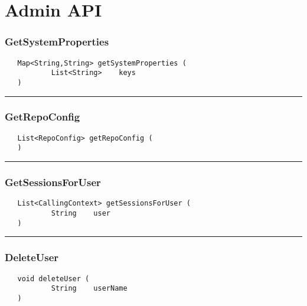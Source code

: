 \chapter{Admin API}

\subsection{GetSystemProperties}
\label{Api:GetSystemProperties}
\begin{verbatim}
   Map<String,String> getSystemProperties (
           List<String>    keys
   )
\end{verbatim}



\rule{15cm}{2pt}
\subsection{GetRepoConfig}
\label{Api:GetRepoConfig}
\begin{verbatim}
   List<RepoConfig> getRepoConfig (
   )
\end{verbatim}



\rule{15cm}{2pt}
\subsection{GetSessionsForUser}
\label{Api:GetSessionsForUser}
\begin{verbatim}
   List<CallingContext> getSessionsForUser (
           String    user
   )
\end{verbatim}



\rule{15cm}{2pt}
\subsection{DeleteUser}
\label{Api:DeleteUser}
\begin{verbatim}
   void deleteUser (
           String    userName
   )
\end{verbatim}



